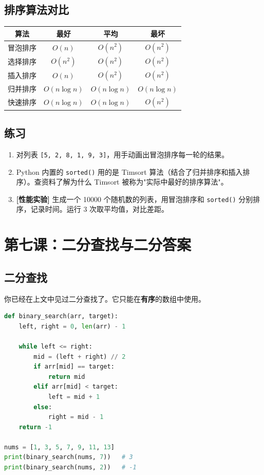 \documentclass[a4paper,12pt]{ctexart}
\begin{document}
\subsection*{排序算法对比}

\begin{center}
\begin{tabular}{|c|c|c|c|}
\hline
\textbf{算法} & \textbf{最好} & \textbf{平均} & \textbf{最坏} \\ \hline
冒泡排序 & $O(n)$ & $O(n^2)$ & $O(n^2)$ \\ \hline
选择排序 & $O(n^2)$ & $O(n^2)$ & $O(n^2)$ \\ \hline
插入排序 & $O(n)$ & $O(n^2)$ & $O(n^2)$ \\ \hline
归并排序 & $O(n \log n)$ & $O(n \log n)$ & $O(n \log n)$ \\ \hline
快速排序 & $O(n \log n)$ & $O(n \log n)$ & $O(n^2)$ \\ \hline
\end{tabular}
\end{center}

\subsection*{练习}

\begin{enumerate}
  \item 对列表 \texttt{[5, 2, 8, 1, 9, 3]}，用手动画出冒泡排序每一轮的结果。
  \item Python 内置的 \texttt{sorted()} 用的是 Timsort 算法（结合了归并排序和插入排序）。查资料了解为什么 Timsort 被称为"实际中最好的排序算法"。
  \item \textbf{[性能实验]} 生成一个 10000 个随机数的列表，用冒泡排序和 \texttt{sorted()} 分别排序，记录时间。运行 3 次取平均值，对比差距。
\end{enumerate}

\section*{第七课：二分查找与二分答案}

\subsection*{二分查找}

你已经在上文中见过二分查找了。它只能在\textbf{有序}的数组中使用。

\begin{lstlisting}[language=Python]
def binary_search(arr, target):
    left, right = 0, len(arr) - 1
    
    while left <= right:
        mid = (left + right) // 2
        if arr[mid] == target:
            return mid
        elif arr[mid] < target:
            left = mid + 1
        else:
            right = mid - 1
    return -1

nums = [1, 3, 5, 7, 9, 11, 13]
print(binary_search(nums, 7))   # 3
print(binary_search(nums, 2))   # -1
\end{lstlisting}
\end{document}
